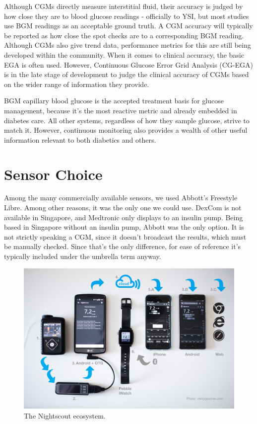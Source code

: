 Although CGMs directly measure interstitial fluid, their accuracy is judged by how close they are to blood glucose readings - officially to YSI, but most studies use BGM readings as an acceptable ground truth. A CGM accuracy will typically be reported as how close the spot checks are to a corresponding BGM reading. Although CGMs also give trend data, performance metrics for this are still being developed within the community. When it comes to clinical accuracy, the basic EGA is often used. However, Continuous Glucose Error Grid Analysis (CG-EGA) is in the late stage of development to judge the clinical accuracy of CGMs based on the wider range of information they provide. 

BGM capillary blood glucose is the accepted treatment basis for glucose management, because it’s the most reactive metric and already embedded in diabetes care. All other systems, regardless of how they sample glucose, strive to match it. However, continuous monitoring also provides a wealth of other useful information relevant to both diabetics and others.

\section{Sensor Choice}

Among the many commercially available sensors, we used Abbott’s Freestyle Libre. Among other reasons, it was the only one we could use. DexCom is not available in Singapore, and Medtronic only displays to an insulin pump. Being based in Singapore without an insulin pump, Abbott was the only option. It is not strictly speaking a CGM, since it doesn’t broadcast the results, which must be manually checked. Since that’s the only difference, for ease of reference it’s typically included under the umbrella term anyway.

\begin{figure}[ht]
\centering\includegraphics[width=1.0\linewidth]{images/nightscout}
\caption{The Nightscout ecosystem.}
\label{fig:nightscout}
\end{figure}

